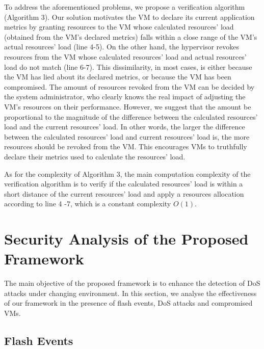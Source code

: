 \documentclass[twocolumn]{bmcart}%
\begin{document}
To address the aforementioned problems, we propose a verification algorithm (Algorithm 3). Our solution motivates the VM to declare its current application metrics by granting resources to the VM whose calculated resources' load (obtained from the VM's declared metrics) falls within a close range of the VM's actual resources' load (line 4-5). On the other hand, the hypervisor revokes resources from the VM whose calculated resources' load and actual resources' load do not match (line 6-7). This dissimilarity, in most cases, is either because the VM has lied about its declared metrics, or because the VM has been compromised. The amount of resources revoked from the VM can be decided by the system administrator, who clearly knows the real impact of adjusting the VM's resources on their performance. However, we suggest that the amount be proportional to the magnitude of the difference between the calculated resources' load and the current resources' load. In other words, the larger the difference between the calculated resources' load and current resources' load is, the more resources should be revoked from the VM. This encourages VMs to truthfully declare their metrics used to calculate the resources' load.

As for the complexity of Algorithm 3, the main computation complexity of the verification algorithm is to verify if the calculated resources' load is within a short distance of the current resources' load and apply a resources allocation according to line 4 -7, which is a constant complexity $O(1)$.

\section*{Security Analysis of the Proposed Framework}

The main objective of the proposed framework is to enhance the detection of DoS attacks under changing environment. In this section, we analyse the effectiveness of our framework in the presence of flash events, DoS attacks and compromised VMs.

\subsection*{Flash Events}
\end{document}
